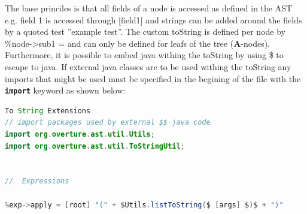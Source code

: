 The base princiles is that all fields of a node is accessed as defined in the AST e.g. field 1 is accessed through [field1] and strings can be added around the fields by a quoted test ''example test''. The custom toString is defined per node by \%node->sub1 = and can only be defined for leafs of the tree (\textbf{A}-nodes). Furthermore, it is possible to embed java withing the toString by using \$ to escape to java. If external java classes are to be used withing the toString any imports that might be used must be specified in the begining of the file with the \texttt{\textbf{import}} keyword as shown below:

\begin{lstlisting}[language=java,tabsize=2,basicstyle=\ttfamily\footnotesize]
To String Extensions
// import packages used by external $$ java code
import org.overture.ast.util.Utils;
import org.overture.ast.util.ToStringUtil;


//  Expressions

%exp->apply = [root] "(" + $Utils.listToString($ [args] $)$ + ")"
\end{lstlisting}


